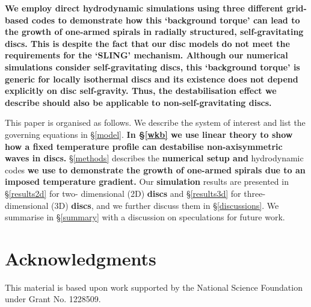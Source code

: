 \documentclass[useAMS,usenatbib]{mn2e}
\begin{document}
{\bf We employ direct hydrodynamic simulations using three different
  grid-based codes to demonstrate how this `background torque' 
  can lead to the growth of one-armed spirals in radially structured, 
  self-gravitating discs. This is despite the fact that our disc
  models do not meet the requirements for the `SLING'
  mechanism. Although our numerical simulations consider
  self-gravitating discs, this `background torque' is generic for
  locally isothermal discs and its existence does not depend
  explicitly on disc self-gravity. Thus, the destabilisation effect we
  describe should also be applicable to non-self-gravitating discs.  
}

This paper is organised as follows. We describe the system of interest
and list the governing equations in 
\S\ref{model}. {\bf In \S\ref{wkb} we use linear theory  to show
  how a fixed temperature profile 
  can destabilise non-axisymmetric waves in discs.} \S\ref{methods} describes
the {\bf numerical setup and} hydrodynamic codes {\bf we use to 
  demonstrate the growth of one-armed spirals due to an imposed
  temperature gradient.} Our {\bf
  simulation} results are presented in  \S\ref{results2d} for two-
dimensional (2D) {\bf
  discs} and \S\ref{results3d} for three-dimensional (3D) {\bf discs}, and we further
discuss them in \S\ref{discussions}. We summarise in \S\ref{summary} 
with a discussion on speculations for future work. 







{\bf
\section*{Acknowledgments}
This material is based upon work supported by the National Science Foundation under Grant No. 1228509.
}



\appendix

\end{document}
